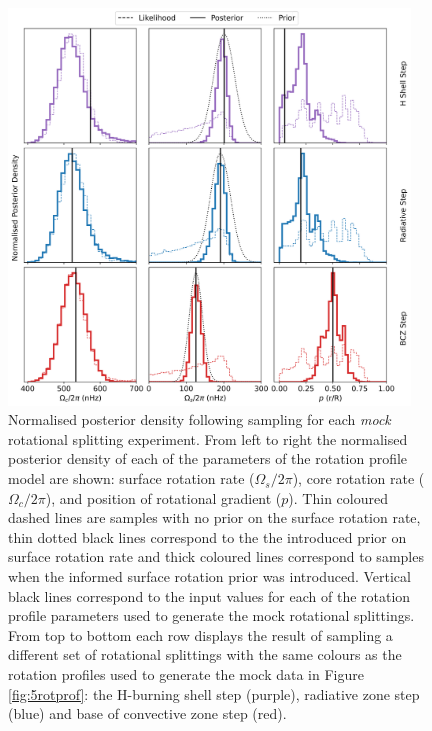 
\begin{figure}
\centering
    \includegraphics[width=0.95\textwidth]{Figures/subgiant_chapter_figures/combined_results.png}
    \caption[Normalised posterior density following sampling for each \textit{mock} rotational splitting experiment.]{Normalised posterior density following sampling for each \textit{mock} rotational splitting experiment. From left to right the normalised posterior density of each of the parameters of the rotation profile model are shown: surface rotation rate ($\Omega_s/2\pi$), core rotation rate ($\Omega_c/2\pi$), and position of rotational gradient ($p$). Thin coloured dashed lines are samples with no prior on the surface rotation rate, thin dotted black lines correspond to the the introduced prior on surface rotation rate and thick coloured lines correspond to samples when the informed surface rotation prior was introduced. Vertical black lines correspond to the input values for each of the rotation profile parameters used to generate the mock rotational splittings. From top to bottom each row displays the result of sampling a different set of rotational splittings with the same colours as the rotation profiles used to generate the mock data in Figure \ref{fig:5rotprof}: the H-burning shell step (purple), radiative zone step (blue) and base of convective zone step (red).} 
    \label{fig:full_results}
\end{figure}

